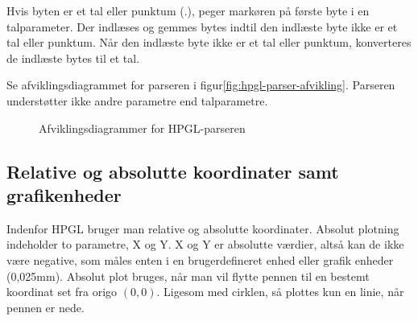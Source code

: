 Hvis byten er et tal eller punktum (.), peger markøren på første byte
i en talparameter. Der indlæses og gemmes bytes indtil den indlæste
byte ikke er et tal eller punktum. Når den indlæste byte ikke er et
tal eller punktum, konverteres de indlæste bytes til et tal.

Se afviklingsdiagrammet for parseren i
figur\vref{fig:hpgl-parser-afvikling}. Parseren understøtter ikke
andre parametre end talparametre.

\begin{figure}[htbp]
  \centering
  \qquad
  \caption{Afviklingsdiagrammer for HPGL-parseren}
  \label{fig:hpgl-parser-afvikling}
\end{figure}


\subsection{Relative og absolutte koordinater samt grafikenheder}
\label{sc:relativ-absolut}

Indenfor HPGL bruger man relative og absolutte koordinater. Absolut
plotning indeholder to parametre, X og Y. X og Y er absolutte værdier,
altså kan de ikke være negative, som måles enten i en brugerdefineret
enhed eller grafik enheder (0,025mm). Absolut plot bruges, når man vil
flytte pennen til en bestemt koordinat set fra origo $(0, 0)$. Ligesom
med cirklen, så plottes kun en linie, når pennen er nede.


